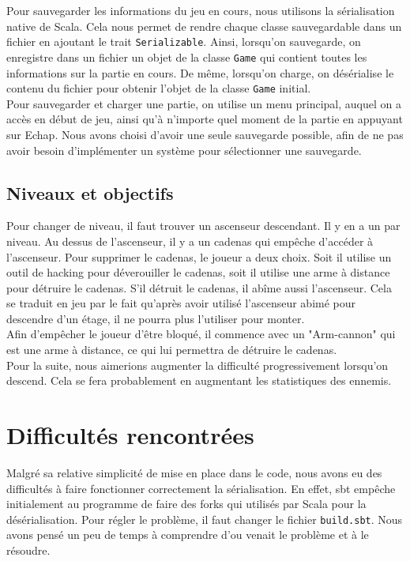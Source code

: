 \documentclass[10pt,a4paper]{article}
\begin{document}
Pour sauvegarder les informations du jeu en cours, nous utilisons la sérialisation native de Scala. Cela nous permet de rendre chaque classe sauvegardable dans un fichier en ajoutant le trait \texttt{Serializable}. Ainsi, lorsqu'on sauvegarde, on enregistre dans un fichier un objet de la classe \texttt{Game} qui contient toutes les informations sur la partie en cours. De même, lorsqu'on charge, on désérialise le contenu du fichier pour obtenir l'objet de la classe \texttt{Game} initial.\\
Pour sauvegarder et charger une partie, on utilise un menu principal, auquel on a accès en début de jeu, ainsi qu'à n'importe quel moment de la partie en appuyant sur Echap. Nous avons choisi d'avoir une seule sauvegarde possible, afin de ne pas avoir besoin d'implémenter un système pour sélectionner une sauvegarde.\\

\subsection{Niveaux et objectifs}

Pour changer de niveau, il faut trouver un ascenseur descendant. Il y en a un par niveau. Au dessus de l'ascenseur, il y a un cadenas qui empêche d'accéder à l'ascenseur. Pour supprimer le cadenas, le joueur a deux choix. Soit il utilise un outil de hacking pour déverouiller le cadenas, soit il utilise une arme à distance pour détruire le cadenas. S'il détruit le cadenas, il abîme aussi l'ascenseur. Cela se traduit en jeu par le fait qu'après avoir utilisé l'ascenseur abimé pour descendre d'un étage, il ne pourra plus l'utiliser pour monter.\\
Afin d'emp\^echer le joueur d'\^etre bloqué, il commence avec un "Arm-cannon" qui est une arme à distance, ce qui lui permettra de détruire le cadenas.\\
Pour la suite, nous aimerions augmenter la difficulté progressivement lorsqu'on descend. Cela se fera probablement en augmentant les statistiques des ennemis.

\section{Difficultés rencontrées}

Malgré sa relative simplicité de mise en place dans le code, nous avons eu des difficultés à faire fonctionner correctement la sérialisation. En effet, sbt empêche initialement au programme de faire des forks qui utilisés par Scala pour la désérialisation. Pour régler le problème, il faut changer le fichier \texttt{build.sbt}. Nous avons pensé un peu de temps à comprendre d'ou venait le problème et à le résoudre.\\
\end{document}

